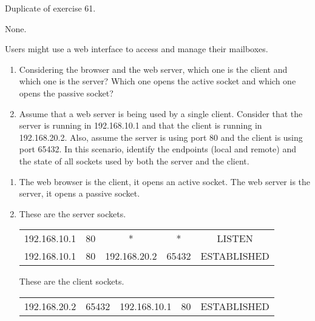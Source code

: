 \begin{Exercise}
Duplicate of exercise 61.
\end{Exercise}
\begin{Answer}
None.
\end{Answer}

\begin{Exercise}
Users might use a web interface to access and manage their mailboxes.
\begin{enumerate}
\item Considering the browser and the web server, which one is the client and which one is the server? Which one opens the active socket and which one opens the passive socket?
\item Assume that a web server is being used by a single client.
Consider that the server is running in 192.168.10.1 and that the client is running in 192.168.20.2. Also, assume the server is using port 80 and the client is using port 65432. In this scenario, identify the endpoints (local and remote) and the state of all sockets used by both the server and the client.
\end{enumerate}
\end{Exercise}
\begin{Answer}
\begin{enumerate}
\item The web browser is the client, it opens an active socket.
The web server is the server, it opens a passive socket.
\item These are the server sockets.
\begin{center}
\begin{tabular}{c|c|c|c|c}
192.168.10.1 & 80 & * & * & LISTEN \\
192.168.10.1 & 80 & 192.168.20.2 & 65432 & ESTABLISHED \\
\end{tabular}
\end{center}

These are the client sockets.
\begin{center}
\begin{tabular}{c|c|c|c|c}
192.168.20.2 & 65432 & 192.168.10.1 & 80 & ESTABLISHED \\
\end{tabular}
\end{center}
\end{enumerate}
\end{Answer}

